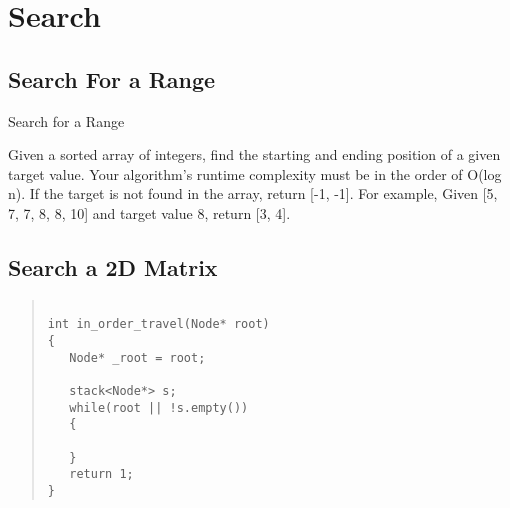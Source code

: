 \chapter{Search}\label{chp:Search}

\section{Search For a Range}


Search for a Range

Given a sorted array of integers, find the starting and ending position of a given target value.
Your algorithm's runtime complexity must be in the order of O(log n).
If the target is not found in the array, return [-1, -1].
For example,
Given [5, 7, 7, 8, 8, 10] and target value 8,
return [3, 4].

\section{Search a 2D Matrix}


\begin{quote}
\begin{verbatim}

int in_order_travel(Node* root)
{
   Node* _root = root;
   
   stack<Node*> s;
   while(root || !s.empty())
   {
   
   }
   return 1;
}

\end{verbatim}
\end{quote}

